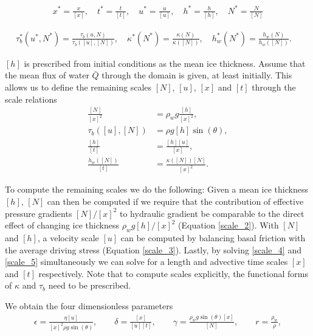 \documentclass[journal abbreviation, manuscript]{copernicus}
\begin{document}
\begin{align}
x^*=\frac{x}{[x]},\quad t^*=\frac{t}{[t]},\quad
u^*=\frac{u}{[u]}, \quad h^*=\frac{h}{[h]},\quad
N^*=\frac{N}{[N]}  \label{scales}
\end{align}

\begin{align}
\tau_b^*(u^*,N^*)=\frac{\tau_b(u,N)}{\tau_b([u],[N])} , \quad 
\kappa^*(N^*)=\frac{\kappa(N)}{\kappa([N])}, \quad 
h_w^*(N^*)=\frac{h_w(N)}{h_w([N])}. \quad 
\end{align}

$[h]$ is prescribed from initial conditions
as the mean ice thickness.
Assume that the mean flux  of  water $\bar{Q}$ through  the  domain  is  given,  at  least  initially.   This  allows  us  to  define  the remaining scales  $[N]$, $[u]$, $[x]$ and 
$[t]$ through the scale relations
\begin{subequations}
\begin{align} 
\frac{[N]}{[x]^2} &= \rho_w g \frac{[h]}{[x]^2}, \label{scale_2}\\
{\tau_b([u],[N])}&=\rho g [h] \sin (\theta), \label{scale_3}\\
\frac{[h]}{[t]}&=\frac{[h][u]}{[x]}, \label{scale_4}\\ 
\frac{h_w([N])}{[t]}&=\frac{\kappa([N])[N]}{[x]^2} \label{scale_5}.
\end{align}
\end{subequations}

To compute the remaining scales we do the following: Given a mean 
ice thickness $[h]$, $[N]$ can then be computed if we require that the contribution of 
effective pressure gradients $[N]/[x]^2$ to hydraulic gradient be 
comparable to the direct effect of changing ice thickness $\rho_w g[h]/[x]^2$ (Equation \ref{scale_2}).
With $[N]$ and $[h]$, a velocity scale $[u]$ can be computed by balancing basal friction with the average
driving stress (Equation \ref{scale_3}).   Lastly, by solving \eqref{scale_4} and \eqref{scale_5} simultaneously we can solve for a length  and advective time scales $[x]$ and $[t]$ respectively. Note that to compute scales explicitly, the functional forms of $\kappa$ and $\tau_b$ need to be prescribed.

We obtain the four dimensionless 
parameters
\begin{align}
\epsilon = \frac{ \eta [u]}{[x]^2  \rho g \sin(\theta) }, \qquad
\delta =  \frac{[x]}{[u][t]}, \qquad 
\gamma = \frac{\rho_w g \sin(\theta) [x] }{[N]}, \qquad  r = \frac{\rho_w}{\rho}, \label{edg}
\end{align}
\end{document}
